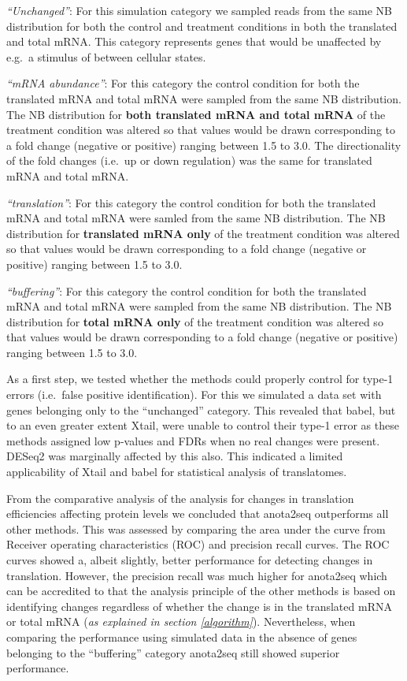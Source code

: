 \documentclass[12pt,openany]{book}
\begin{document}
\emph{``Unchanged''}: For this simulation category we sampled reads from
the same NB distribution for both the control and treatment conditions
in both the translated and total mRNA. This category represents genes
that would be unaffected by e.g.~a stimulus of between cellular states.

\emph{``mRNA abundance''}: For this category the control condition for
both the translated mRNA and total mRNA were sampled from the same NB
distribution. The NB distribution for \textbf{both translated mRNA and
total mRNA} of the treatment condition was altered so that values would
be drawn corresponding to a fold change (negative or positive) ranging
between 1.5 to 3.0. The directionality of the fold changes (i.e.~up or
down regulation) was the same for translated mRNA and total mRNA.

\emph{``translation''}: For this category the control condition for both
the translated mRNA and total mRNA were samled from the same NB
distribution. The NB distribution for \textbf{translated mRNA only} of
the treatment condition was altered so that values would be drawn
corresponding to a fold change (negative or positive) ranging between
1.5 to 3.0.

\emph{``buffering''}: For this category the control condition for both
the translated mRNA and total mRNA were sampled from the same NB
distribution. The NB distribution for \textbf{total mRNA only} of the
treatment condition was altered so that values would be drawn
corresponding to a fold change (negative or positive) ranging between
1.5 to 3.0.

As a first step, we tested whether the methods could properly control
for type-1 errors (i.e.~false positive identification). For this we
simulated a data set with genes belonging only to the ``unchanged''
category. This revealed that babel, but to an even greater extent Xtail,
were unable to control their type-1 error as these methods assigned low
p-values and FDRs when no real changes were present. DESeq2 was
marginally affected by this also. This indicated a limited applicability
of Xtail and babel for statistical analysis of translatomes.

From the comparative analysis of the analysis for changes in translation
efficiencies affecting protein levels we concluded that anota2seq
outperforms all other methods. This was assessed by comparing the area
under the curve from Receiver operating characteristics (ROC) and
precision recall curves. The ROC curves showed a, albeit slightly,
better performance for detecting changes in translation. However, the
precision recall was much higher for anota2seq which can be accredited
to that the analysis principle of the other methods is based on
identifying changes regardless of whether the change is in the
translated mRNA or total mRNA (\emph{as explained in section
\ref{algorithm}}). Nevertheless, when comparing the performance using
simulated data in the absence of genes belonging to the ``buffering''
category anota2seq still showed superior performance.
\end{document}
